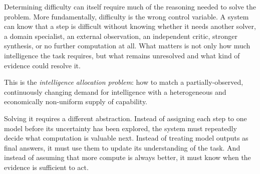 Determining difficulty can itself require much of the reasoning needed to solve
the problem. More fundamentally, difficulty is the wrong control variable. A
system can know that a step is difficult without knowing whether it needs
another solver, a domain specialist, an external observation, an independent
critic, stronger synthesis, or no further computation at all. What matters is
not only how much intelligence the task requires, but what remains unresolved
and what kind of evidence could resolve it.

This is the \emph{intelligence allocation problem}: how to match a
partially-observed, continuously changing demand for intelligence with a
heterogeneous and economically non-uniform supply of capability.

Solving it requires a different abstraction. Instead of assigning each step to
one model before its uncertainty has been explored, the system must repeatedly
decide what computation is valuable next. Instead of treating model outputs as
final answers, it must use them to update its understanding of the task. And
instead of assuming that more compute is always better, it must know when the
evidence is sufficient to act.
